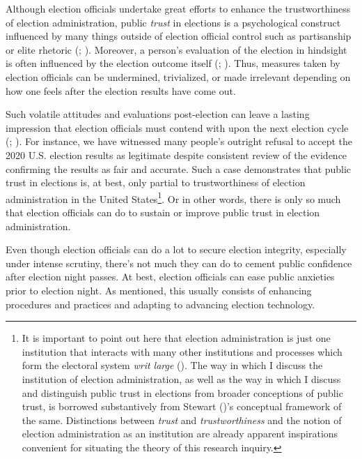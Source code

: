 \documentclass[
  11pt,
  a4paper,
]{scrartcl}
\begin{document}
Although election officials undertake great efforts to enhance the
trustworthiness of election administration, public \emph{trust} in
elections is a psychological construct influenced by many things outside
of election official control such as partisanship or elite rhetoric
(;
). Moreover, a
person's evaluation of the election in hindsight is often influenced by
the election outcome itself (; ). Thus, measures
taken by election officials can be undermined, trivialized, or made
irrelevant depending on how one feels after the election results have
come out.

Such volatile attitudes and evaluations post-election can leave a
lasting impression that election officials must contend with upon the
next election cycle (;
). For instance, we
have witnessed many people's outright refusal to accept the 2020 U.S.
election results as legitimate despite consistent review of the evidence
confirming the results as fair and accurate. Such a case demonstrates
that public trust in elections is, at best, only partial to
trustworthiness of election administration in the United
States\footnote{It is important to point out here that election
  administration is just one institution that interacts with many other
  institutions and processes which form the electoral system \emph{writ
  large} (). The way in which I
  discuss the institution of election administration, as well as the way
  in which I discuss and distinguish public trust in elections from
  broader conceptions of public trust, is borrowed substantively from
  Stewart ()'s conceptual framework of
  the same. Distinctions between \emph{trust} and \emph{trustworthiness}
  and the notion of election administration as an institution are
  already apparent inspirations convenient for situating the theory of
  this research inquiry.}. Or in other words, there is only so much that
election officials can do to sustain or improve public trust in election
administration.

Even though election officials can do a lot to secure election
integrity, especially under intense scrutiny, there's not much they can
do to cement public confidence after election night passes. At best,
election officials can ease public anxieties prior to election night. As
mentioned, this usually consists of enhancing procedures and practices
and adapting to advancing election technology.
\end{document}
